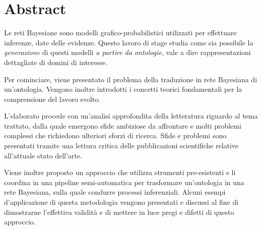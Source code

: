 \cleardoublepage
\begingroup
\let\clearpage\endgroup
\null{}

\chapter*{\centering Abstract}
Le reti Bayesiane sono modelli grafico-probabilistici utilizzati per effettuare inferenze, date delle evidenze. 
Questo lavoro di stage studia come sia possibile la \textit{generazione} di questi modelli \textit{a partire da ontologie}, vale a dire rappresentazioni dettagliate di domini di interesse.

Per cominciare, viene presentato il problema della traduzione in rete Bayesiana di un'ontologia. Vengono inoltre introdotti i concetti teorici fondamentali per la comprensione del lavoro svolto.

L'elaborato procede con un'analisi approfondita della letteratura riguardo al tema trattato, dalla quale emergono sfide ambiziose da affrontare e molti problemi complessi che richiedono ulteriori sforzi di ricerca. Sfide e problemi sono presentati tramite una lettura critica delle pubblicazioni scientifiche relative all'attuale stato dell'arte.

Viene inoltre proposto un approccio che utilizza strumenti pre-esistenti e li coordina in una pipeline semi-automatica per trasformare un'ontologia in una rete Bayesiana, sulla quale condurre processi inferenziali. 
Alcuni esempi d'applicazione di questa metodologia vengono presentati e discussi al fine di dimostrarne l'effettiva validità e di mettere in luce pregi e difetti di questo approccio.




 \null
